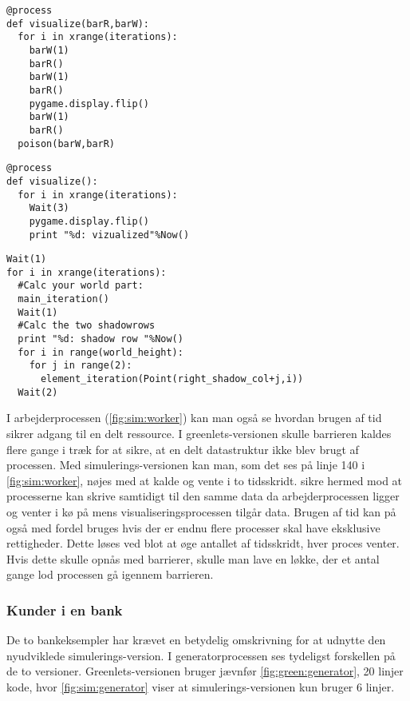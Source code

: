 \begin{lstlisting}[firstnumber=157 ,float=hbtp, label=fig:green:visualize, caption=greenlets-versionen af visualize]
@process
def visualize(barR,barW):
  for i in xrange(iterations):
    barW(1)
    barR()
    barW(1)
    barR()
    pygame.display.flip()
    barW(1)
    barR()
  poison(barW,barR)     
\end{lstlisting}
\begin{lstlisting}[firstnumber=144 ,float=hbtp, label=fig:sim:visualize, caption=simulerings-versionen af visualize]
@process
def visualize():
  for i in xrange(iterations):
    Wait(3)  
    pygame.display.flip()
    print "%d: vizualized"%Now()
\end{lstlisting}
\begin{lstlisting}[firstnumber=130 ,float=hbtp, label=fig:sim:worker, caption=Uddrag af arbejderprocessen i simulering]
Wait(1)
for i in xrange(iterations):
  #Calc your world part:
  main_iteration()
  Wait(1)
  #Calc the two shadowrows
  print "%d: shadow row "%Now()
  for i in range(world_height):
    for j in range(2):
      element_iteration(Point(right_shadow_col+j,i))
  Wait(2)
\end{lstlisting}
I arbejderprocessen (\cref{fig:sim:worker}) kan man også se hvordan brugen af tid  sikrer adgang til en delt ressource. I  greenlets-versionen skulle barrieren  kaldes flere gange i træk for at sikre, at en delt datastruktur ikke blev brugt af processen. Med simulerings-versionen kan man, som det ses på linje 140 i \cref{fig:sim:worker}, nøjes med at kalde  og vente i to tidsskridt. 
 sikre hermed mod at processerne kan skrive samtidigt til den samme data da arbejderprocessen ligger og venter i kø på  mens visualiseringsprocessen tilgår data. Brugen af tid kan på også med fordel bruges hvis der er endnu flere  processer skal have eksklusive rettigheder. Dette løses ved blot at øge antallet af tidsskridt, hver proces venter. Hvis dette skulle opnås med barrierer, skulle man lave en løkke, der et antal gange lod processen gå igennem barrieren.

\subsubsection{Kunder i en bank}
De to bankeksempler har krævet en betydelig omskrivning for at udnytte den nyudviklede simulerings-version. I generatorprocessen ses tydeligst forskellen på de to versioner. Greenlets-versionen bruger jævnfør \cref{fig:green:generator}, 20 linjer kode, hvor \cref{fig:sim:generator} viser at simulerings-versionen kun bruger 6 linjer. 

